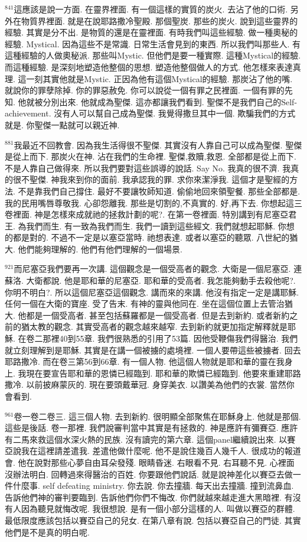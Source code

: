 \documentclass{book}
\begin{document}
$^{841}$這應該是說一方面.
在靈界裡面.
有一個這樣的實質的炭火.
去沾了他的口術.
另外在物質界裡面.
就是在說耶路撒冷聖殿.
那個聖炭.
那些的炭火.
說到這些靈界的經驗.
其實是分不出.
是物質的還是在靈裡面.
有時我們叫這些經驗.
做一種奧秘的經驗.
Mystical.
因為這些不是常識.
日常生活會見到的東西.
所以我們叫那些人.
有這種經驗的人做奧秘派.
那些叫Mystic.
但他們是要一種實際.
這種Mystical的經驗.
而這種經驗.
是深刻地塑造他整個的思想.
塑造他整個做人的方式.
他怎樣來表達真理.
這一刻其實他就是Mystic.
正因為他有這個Mystical的經驗.
那炭沾了他的嘴.
就說你的罪孽除掉.
你的罪惡赦免.
你可以說從一個有罪之民裡面.
一個有罪的先知.
他就被分別出來.
他就成為聖傑.
這亦都讓我們看到.
聖傑不是我們自己的Self-achievement.
沒有人可以幫自己成為聖傑.
我覺得撒旦其中一個.
欺騙我們的方式就是.
你聖傑一點就可以親近神.

$^{881}$我最近不回教會.
因為我生活得很不聖傑.
其實沒有人靠自己可以成為聖傑.
聖傑是從上而下.
那炭火在神.
沾在我們的生命裡.
聖傑,救贖,救恩.
全部都是從上而下.
不是人靠自己做得來.
所以我們要對這些誤導的說話.
Say No.
我真的很不濟.
我真的很不聖傑.
神我來到你的面前.
我承認我的罪.
求你來潔淨我.
這個才是聖經的方法.
不是靠我們自己撐住.
最好不要讓牧師知道.
偷偷地回來領聖餐.
那些全部都是.
我的民用嘴唇尊敬我.
心卻怨離我.
那些是切割的,不真實的.
好,再下去.
你想起這三卷裡面.
神是怎樣來成就祂的拯救計劃的呢?.
在第一卷裡面.
特別講到有尼塞亞君王.
為我們而生.
有一致為我們而生.
我們一讀到這些經文.
我們就想起耶穌.
你想的都是對的.
不過不一定是以塞亞當時.
祂想表達.
或者以塞亞的聽眾.
八世紀的猶大.
他們能夠理解的.
他們有他們理解的一個場景.

$^{921}$而尼塞亞我們要再一次講.
這個觀念是一個受高者的觀念.
大衛是一個尼塞亞.
連蘇洛.
大衛都說.
他是耶和華的尼塞亞.
耶和華的受高者.
我怎能夠動手去殺他呢?.
你明不明白?.
所以這個尼塞亞這個觀念.
講而來的來講.
他沒有指定一定是講耶穌.
任何一個在大衛的寶座.
受了告末.
有神的靈與他同在.
坐在這個位置上去管治猶大.
他都是一個受高者.
甚至包括蘇羅都是一個受高者.
但是去到新約.
或者新約之前的猶太教的觀念.
其實受高者的觀念越來越窄.
去到新約就更加指定解釋就是耶穌.
在卷二那裡40到55章.
我們很熟悉的引用了53篇.
因他受鞭傷我們得醫治.
我們就立刻理解到是耶穌.
其實是在講一個被擄的處境裡.
一個人要帶這些被擄者.
回去耶路撒冷.
而在卷三第56到66章.
有一個人物.
他這個人物就是耶和華的靈在我身上.
我現在要宣告耶和華的恩憐已經臨到.
耶和華的欺憐已經臨到.
他要來重建耶路撒冷.
以前披麻蒙灰的.
現在要頭戴華冠.
身穿美衣.
以讚美為他們的衣裳.
當然你會看到.

$^{961}$卷一卷二卷三.
這三個人物.
去到新約.
很明顯全部聚焦在耶穌身上.
他就是那個.
這些是後話.
卷一那裡.
我們說審判當中其實是有拯救的.
神是應許有彌賽亞.
應許有二馬來救這個水深火熱的民族.
沒有讀完的第六章.
這個panel繼續說出來.
以賽亞說我在這裡請差遣我.
差遣他做什麼呢.
他不是說住幾百人幾千人.
很成功的報道會.
他在說對那些心夢自由耳朵發殘.
眼睛昏迷.
右眼看不見.
右耳聽不見.
心裡面沒辦法明白.
回轉過來得醫治的百姓.
你要跟他們說話.
就是說神差化以賽亞去做一件什麼事.
self defeating ministry.
你去說.
你去撞牆.
每天出去撞牆.
撞到流鼻血.
告訴他們神的審判要臨到.
告訴他們你們不悔改.
你們就越來越走進大黑暗裡.
有沒有人因為聽見就悔改呢.
我很想說.
是有一個小部分這樣的人.
叫做以賽亞的群體.
最低限度應該包括以賽亞自己的兒女.
在第八章有說.
包括以賽亞自己的門徒.
其實他們是不是真的明白呢.
\end{document}
